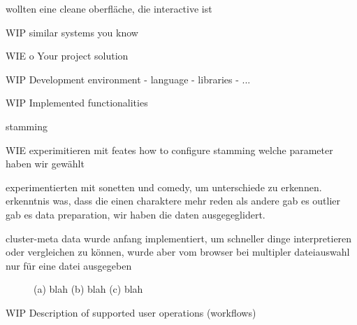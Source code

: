 \documentclass[runningheads]{llncs}
\begin{document}
wollten eine cleane oberfläche, die interactive ist




WIP
similar systems you know


WIE
o Your project solution

WIP
Development environment
- language
- libraries
- ...

WIP
Implemented functionalities

stamming


WIE
experimitieren mit feates 
how to configure stamming
welche parameter haben wir gewählt

experimentierten mit 
sonetten und comedy, um unterschiede zu erkennen.
erkenntnis was, dass die einen charaktere mehr reden als andere
gab es outlier
gab es data preparation, wir haben die daten ausgegeglidert.


cluster-meta data wurde anfang implementiert, um schneller dinge interpretieren oder vergleichen zu können, wurde aber vom browser bei multipler dateiauswahl nur für eine datei ausgegeben

\begin{figure}
    \centering
    \caption{(a) blah (b) blah (c) blah}
    \label{fig:foobar}
\end{figure}


WIP
Description of supported user operations (workflows)
\end{document}
